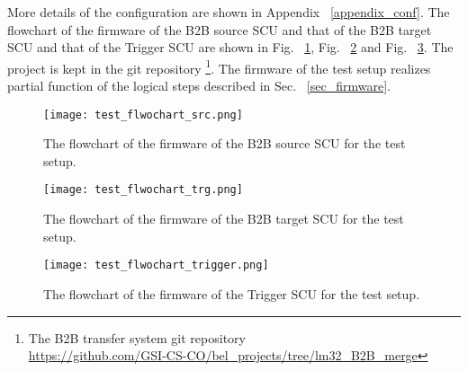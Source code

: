 More details of the configuration are shown in Appendix ~\ref{appendix_conf}. The flowchart of the firmware of the B2B source SCU and that of the B2B target SCU and that of the Trigger SCU are shown in Fig. ~\ref{test_flwochart}, Fig. ~\ref{test_flwochart1} and Fig. ~\ref{test_flwochart2}. The project is kept in the git repository \footnote{The B2B transfer system git repository \\ \url{https://github.com/GSI-CS-CO/bel_projects/tree/lm32_B2B_merge}}. The firmware of the test setup realizes partial function of the logical steps described in Sec. ~\ref{sec_firmware}.
\begin{figure}[H]
   \centering   
   \texttt{[image: test\_flwochart\_src.png]}
   \caption{The flowchart of the firmware of the B2B source SCU for the test setup.}
   \label{test_flwochart}
\end{figure}
\begin{figure}[H]
   \centering   
   \texttt{[image: test\_flwochart\_trg.png]}
   \caption{The flowchart of the firmware of the B2B target SCU for the test setup.}
   \label{test_flwochart1}
\end{figure}
\begin{figure}[H]
   \centering   
   \texttt{[image: test\_flwochart\_trigger.png]}
   \caption{The flowchart of the firmware of the Trigger SCU for the test setup.}
   \label{test_flwochart2}
\end{figure}


